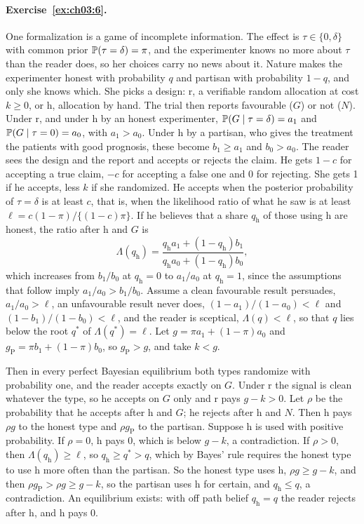 \paragraph{Exercise~\ref{ex:ch03:6}.} One formalization is a game of incomplete information. The effect is $\tau \in \{0, \delta\}$ with common prior $\mathbb{P}(\tau = \delta) = \pi$, and the experimenter knows no more about $\tau$ than the reader does, so her choices carry no news about it. Nature makes the experimenter honest with probability $q$ and partisan with probability $1 - q$, and only she knows which. She picks a design: r, a verifiable random allocation at cost $k \ge 0$, or h, allocation by hand. The trial then reports favourable ($G$) or not ($N$). Under r, and under h by an honest experimenter, $\mathbb{P}(G \mid \tau = \delta) = a_1$ and $\mathbb{P}(G \mid \tau = 0) = a_0$, with $a_1 > a_0$. Under h by a partisan, who gives the treatment the patients with good prognosis, these become $b_1 \ge a_1$ and $b_0 > a_0$. The reader sees the design and the report and accepts or rejects the claim. He gets $1 - c$ for accepting a true claim, $-c$ for accepting a false one and 0 for rejecting. She gets 1 if he accepts, less $k$ if she randomized. He accepts when the posterior probability of $\tau = \delta$ is at least $c$, that is, when the likelihood ratio of what he saw is at least $\ell = c(1 - \pi)/\{(1 - c)\pi\}$. If he believes that a share $q_{\mathrm{h}}$ of those using h are honest, the ratio after h and $G$ is
\[
\Lambda(q_{\mathrm{h}}) = \frac{q_{\mathrm{h}} a_1 + (1 - q_{\mathrm{h}}) b_1}{q_{\mathrm{h}} a_0 + (1 - q_{\mathrm{h}}) b_0},
\]
which increases from $b_1/b_0$ at $q_{\mathrm{h}} = 0$ to $a_1/a_0$ at $q_{\mathrm{h}} = 1$, since the assumptions that follow imply $a_1/a_0 > b_1/b_0$. Assume a clean favourable result persuades, $a_1/a_0 > \ell$, an unfavourable result never does, $(1 - a_1)/(1 - a_0) < \ell$ and $(1 - b_1)/(1 - b_0) < \ell$, and the reader is sceptical, $\Lambda(q) < \ell$, so that $q$ lies below the root $q^*$ of $\Lambda(q^*) = \ell$. Let $g = \pi a_1 + (1 - \pi) a_0$ and $g_{\mathrm{P}} = \pi b_1 + (1 - \pi) b_0$, so $g_{\mathrm{P}} > g$, and take $k < g$.

Then in every perfect Bayesian equilibrium both types randomize with probability one, and the reader accepts exactly on $G$. Under r the signal is clean whatever the type, so he accepts on $G$ only and r pays $g - k > 0$. Let $\rho$ be the probability that he accepts after h and $G$; he rejects after h and $N$. Then h pays $\rho g$ to the honest type and $\rho g_{\mathrm{P}}$ to the partisan. Suppose h is used with positive probability. If $\rho = 0$, h pays 0, which is below $g - k$, a contradiction. If $\rho > 0$, then $\Lambda(q_{\mathrm{h}}) \ge \ell$, so $q_{\mathrm{h}} \ge q^* > q$, which by Bayes' rule requires the honest type to use h more often than the partisan. So the honest type uses h, $\rho g \ge g - k$, and then $\rho g_{\mathrm{P}} > \rho g \ge g - k$, so the partisan uses h for certain, and $q_{\mathrm{h}} \le q$, a contradiction. An equilibrium exists: with off path belief $q_{\mathrm{h}} = q$ the reader rejects after h, and h pays 0.

